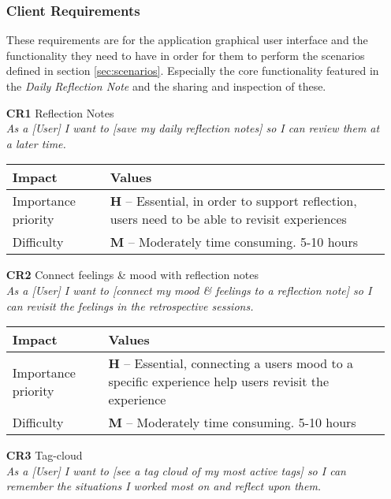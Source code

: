 \begin{itemize}
\subsubsection{Client Requirements}
These requirements are for the application graphical user interface and the functionality they need to have in order for them to perform the scenarios defined in section \ref{sec:scenarios}. Especially the core functionality featured in the \emph{Daily Reflection Note} and the sharing and inspection of these. 
    \item[\textbf{CR1}] Reflection Notes\\
        \textit{\small{As a [User] I want to [save my daily reflection notes] so I can review them at a later time.}}

        \begin{tabular}{| l | p{8cm} |}
            \hline
            \rowcolor[gray]{0.8}
            \textbf{Impact} & \textbf{Values} \\
            \hline
            Importance priority & \textbf{H} -- Essential, in order to support reflection, users need to be able to revisit experiences\\
            Difficulty & \textbf{M} -- Moderately time consuming. 5-10 hours\\
            \hline
        \end{tabular}
    \vspace{0.5cm}

    \item[\textbf{CR2}] Connect feelings \& mood with reflection notes\\
        \textit{\small{As a [User] I want to [connect my mood \& feelings to a reflection note] so I can revisit the feelings in the retrospective sessions.}}

        \begin{tabular}{| l | p{8cm} |}
            \hline
            \rowcolor[gray]{0.8}
            \textbf{Impact} & \textbf{Values} \\
            \hline
            Importance priority & \textbf{H} -- Essential, connecting a users mood to a specific experience help users revisit the experience\\
            Difficulty & \textbf{M} -- Moderately time consuming. 5-10 hours\\
            \hline
        \end{tabular}
    \vspace{0.5cm}

    \item[\textbf{CR3}] Tag-cloud\\
        \textit{\small{As a [User] I want to [see a tag cloud of my most active tags] so I can remember the situations I worked most on and reflect upon them.}}


\end{itemize}
